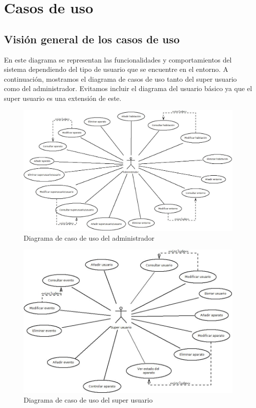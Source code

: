 \section{Casos de uso}
\subsection{Visi\'on general de los casos de uso}
En este diagrama se representan las funcionalidades y comportamientos del sistema dependiendo del tipo de usuario que se encuentre en el entorno.
A continuaci\'on, mostramos el diagrama de casos de uso tanto del super usuario como del administrador. Evitamos incluir el diagrama del usuario b\'asico ya que el super usuario es una extensi\'on de este.
\begin{figure}
	\centering
	\includegraphics[scale=0.5]{4.Disenio/Imagenes/CasosDeUsoDeAdministrador}
	\caption{Diagrama de caso de uso del administrador}
\end{figure}

\begin{figure}
	\centering
	\includegraphics[scale=0.5]{4.Disenio/Imagenes/CasosDeUsoSuperUsuario}
	\caption{Diagrama de caso de uso del super usuario}
\end{figure}

